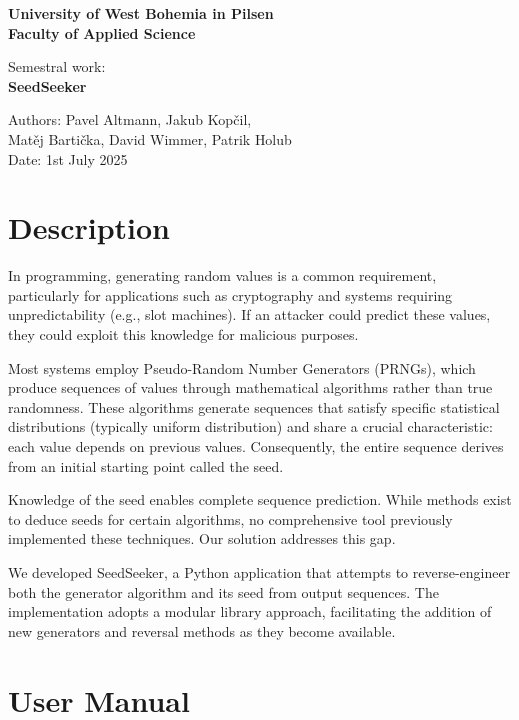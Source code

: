 \documentclass[12pt, a4paper]{report}
\begin{document}

\begin{center}
    \Large{\textbf{University of West Bohemia in Pilsen\\Faculty of Applied Science}}

    \vspace{\fill}
    \normalsize{Semestral work:\\}
    \Large{\textbf{SeedSeeker}}

    \vspace{\fill}
    \normalsize{Authors: Pavel Altmann, Jakub Kopčil,\\Matěj Bartička, David Wimmer, Patrik Holub\\Date: 1st July 2025}
\end{center}
\newpage

\setcounter{page}{2}
\tableofcontents
\newpage

\chapter{Description}
In programming, generating random values is a common requirement, particularly for applications such as 
cryptography and systems requiring unpredictability (e.g., slot machines). If an attacker could predict 
these values, they could exploit this knowledge for malicious purposes.

Most systems employ Pseudo-Random Number Generators (PRNGs), which produce sequences of values through 
mathematical algorithms rather than true randomness. These algorithms generate sequences that satisfy specific 
statistical distributions (typically uniform distribution) and share a crucial characteristic: each value depends 
on previous values. Consequently, the entire sequence derives from an initial starting point called the seed.

Knowledge of the seed enables complete sequence prediction. While methods exist to deduce seeds for certain 
algorithms, no comprehensive tool previously implemented these techniques. Our solution addresses this gap.

We developed SeedSeeker, a Python application that attempts to reverse-engineer both the generator algorithm and 
its seed from output sequences. The implementation adopts a modular library approach, facilitating the 
addition of new generators and reversal methods as they become available.

\chapter{User Manual}
\end{document}
